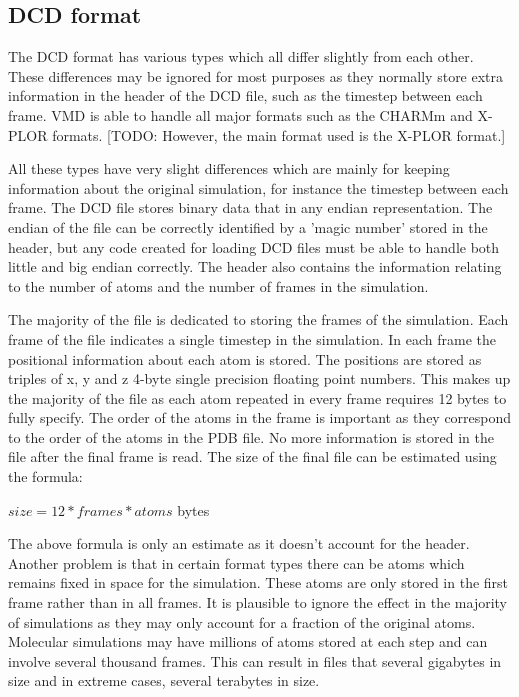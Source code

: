 \documentclass[a4paper,11pt]{report}
\begin{document}
\subsection{DCD format}
The DCD format has various types which all differ slightly from each other. These differences may be ignored for most purposes as they normally store extra information in the header of the DCD file, such as the timestep between each frame. VMD is able to handle all major formats such as the CHARMm and X-PLOR formats. [TODO: However, the main format used is the X-PLOR format.] \cite{vmddcdformat}

All these types have very slight differences which are mainly for keeping information about the original simulation, for instance the timestep between each frame. The DCD file stores binary data that in any endian representation. The endian of the file can be correctly identified by a 'magic number' stored in the header, but any code created for loading DCD files must be able to handle both little and big endian correctly. The header also contains the information relating to the number of atoms and the number of frames in the simulation.

The majority of the file is dedicated to storing the frames of the simulation. Each frame of the file indicates a single timestep in the simulation. In each frame the positional information about each atom is stored. The positions are stored as triples of x, y and z 4-byte single precision floating point numbers. This makes up the majority of the file as each atom repeated in every frame requires 12 bytes to fully specify. The order of the atoms in the frame is important as they correspond to the order of the atoms in the PDB file. No more information is stored in the file after the final frame is read. The size of the final file can be estimated using the formula: 

\begin{center} $size = 12*frames*atoms$ bytes\end{center}

The above formula is only an estimate as it doesn't account for the header. Another problem is that in certain format types there can be atoms which remains fixed in space for the simulation. These atoms are only stored in the first frame rather than in all frames. It is plausible to ignore the effect in the majority of simulations as they may only account for a fraction of the original atoms. Molecular simulations may have millions of atoms stored at each step and can involve several thousand frames. This can result in files that several gigabytes in size and in extreme cases, several terabytes in size.
\end{document}
